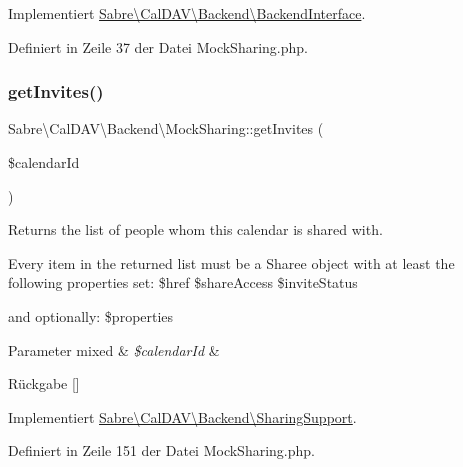 Implementiert \mbox{\hyperlink{interface_sabre_1_1_cal_d_a_v_1_1_backend_1_1_backend_interface_a41d069c48af0155b8e6e04bee46c70ba}{Sabre\textbackslash{}\+Cal\+D\+A\+V\textbackslash{}\+Backend\textbackslash{}\+Backend\+Interface}}.



Definiert in Zeile 37 der Datei Mock\+Sharing.\+php.

\mbox{\label{class_sabre_1_1_cal_d_a_v_1_1_backend_1_1_mock_sharing_a00ec7859036057a4ebce446f169a60b6}} 
\subsubsection{\texorpdfstring{get\+Invites()}{getInvites()}}
{\footnotesize\ttfamily Sabre\textbackslash{}\+Cal\+D\+A\+V\textbackslash{}\+Backend\textbackslash{}\+Mock\+Sharing\+::get\+Invites (\begin{DoxyParamCaption}\item[{}]{\$calendar\+Id }\end{DoxyParamCaption})}

Returns the list of people whom this calendar is shared with.

Every item in the returned list must be a Sharee object with at least the following properties set\+: \$href \$share\+Access \$invite\+Status

and optionally\+: \$properties


\begin{DoxyParams}[1]{Parameter}
mixed & {\em \$calendar\+Id} & \\
\hline
\end{DoxyParams}
\begin{DoxyReturn}{Rückgabe}
\mbox{[}\mbox{]} 
\end{DoxyReturn}


Implementiert \mbox{\hyperlink{interface_sabre_1_1_cal_d_a_v_1_1_backend_1_1_sharing_support_a82223ce074cb75008e420beda5df94c8}{Sabre\textbackslash{}\+Cal\+D\+A\+V\textbackslash{}\+Backend\textbackslash{}\+Sharing\+Support}}.



Definiert in Zeile 151 der Datei Mock\+Sharing.\+php.

